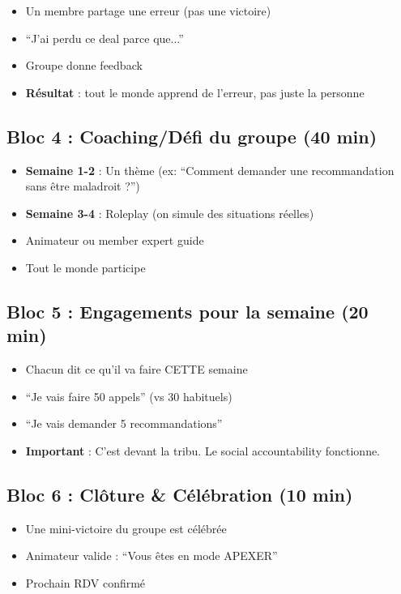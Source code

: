 \documentclass[12pt,a4paper,openany]{book}
\begin{document}
\begin{itemize}
\item Un membre partage une erreur (pas une victoire)
\item ``J'ai perdu ce deal parce que...''
\item Groupe donne feedback
\item \textbf{Résultat} : tout le monde apprend de l'erreur, pas juste la personne
\end{itemize}

\subsection{Bloc 4 : Coaching/Défi du groupe (40 min)}

\begin{itemize}
\item \textbf{Semaine 1-2} : Un thème (ex: ``Comment demander une recommandation sans être maladroit ?'')
\item \textbf{Semaine 3-4} : Roleplay (on simule des situations réelles)
\item Animateur ou member expert guide
\item Tout le monde participe
\end{itemize}

\subsection{Bloc 5 : Engagements pour la semaine (20 min)}

\begin{itemize}
\item Chacun dit ce qu'il va faire CETTE semaine
\item ``Je vais faire 50 appels'' (vs 30 habituels)
\item ``Je vais demander 5 recommandations''
\item \textbf{Important} : C'est devant la tribu. Le social accountability fonctionne.
\end{itemize}

\subsection{Bloc 6 : Clôture \& Célébration (10 min)}

\begin{itemize}
\item Une mini-victoire du groupe est célébrée
\item Animateur valide : ``Vous êtes en mode APEXER''
\item Prochain RDV confirmé
\end{itemize}
\end{document}
